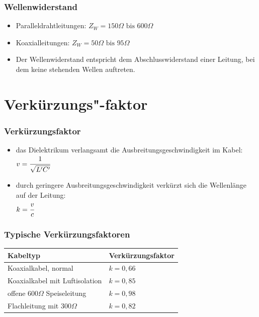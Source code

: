 \begin{frame}
  \frametitle{Wellenwiderstand}
  \begin{itemize}
      \begin{block}{Wellenwiderstand}
        $Z_W = \sqrt{\cfrac{L'}{C'}}$
      \end{block}
    \item Paralleldrahtleitungen: $Z_W = 150 \Omega \text{ bis } 600 \Omega$
    \item Koaxialleitungen: $Z_W = 50 \Omega \text{ bis } 95 \Omega$
    \item Der Wellenwiderstand entspricht dem Abschlusswiderstand einer Leitung, bei dem keine stehenden Wellen auftreten.
  \end{itemize}
\end{frame}

\section*{Verkürzungs"-faktor}
\begin{frame}
  \frametitle{Verkürzungsfaktor}
  \begin{itemize}
    \item das Dielektrikum verlangsamt die Ausbreitungsgeschwindigkeit im Kabel: \\
      $v = \cfrac{1}{\sqrt{L' C'}}$
    \item durch geringere Ausbreitungsgeschwindigkeit verkürzt sich die
      Wellenlänge auf der Leitung: \\ $k = \cfrac{v}{c}$
  \end{itemize}
\end{frame}

\begin{frame}
  \frametitle{Typische Verkürzungsfaktoren}
  \begin{center}
    \begin{tabular}{l|l}
      \textbf{Kabeltyp} & \textbf{Verkürzungsfaktor} \\ \hline
      Koaxialkabel, normal & $k = 0,66$ \\
      Koaxialkabel mit Luftisolation & $k = 0,85$ \\
      offene $600 \Omega$ Speiseleitung & $k = 0,98$ \\
      Flachleitung mit $300 \Omega$ & $k = 0,82$ \\
    \end{tabular}
  \end{center}
\end{frame}

